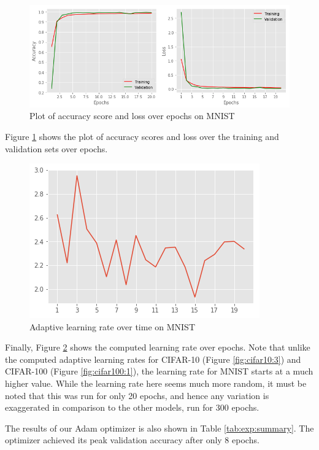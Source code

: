 \documentclass{article}
\begin{document}
\begin{figure}
    \centering
    \includegraphics[scale=0.4]{mnist-plot.png}
    \caption{Plot of accuracy score and loss over epochs on MNIST}
    \label{fig:mnist:1}
\end{figure}

Figure \ref{fig:mnist:1} shows the plot of accuracy scores and loss over the training and validation sets over epochs.

\begin{figure}
    \centering
    \includegraphics[scale=0.4]{mnist-lr.png}
    \caption{Adaptive learning rate over time on MNIST}
    \label{fig:mnist:2}
\end{figure}

Finally, Figure \ref{fig:mnist:2} shows the computed learning rate over epochs. Note that unlike the computed adaptive learning rates for CIFAR-10 (Figure \ref{fig:cifar10:3}) and CIFAR-100 (Figure \ref{fig:cifar100:1}), the learning rate for MNIST starts at a much higher value. While the learning rate here seems much more random, it must be noted that this was run for only 20 epochs, and hence any variation is exaggerated in comparison to the other models, run for 300 epochs.

The results of our Adam optimizer is also shown in Table \ref{tab:exp:summary}. The optimizer achieved its peak validation accuracy after only 8 epochs. 
\end{document}
